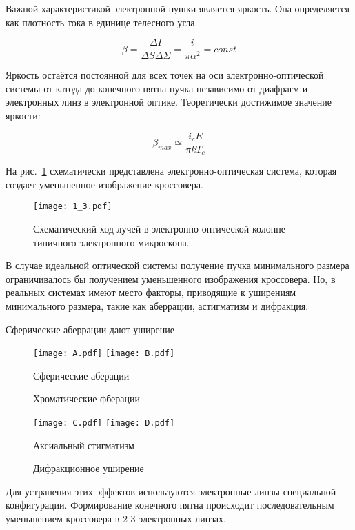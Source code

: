 Важной характеристикой электронной пушки является яркость. Она определяется как плотность тока в единице телесного угла.

\begin{equation}
\beta = \frac{\Delta I}{\Delta S\Delta\Sigma}= \frac{i}{\pi \alpha^2}= const
\label{eq:A2}
\end{equation}

Яркость остаётся постоянной для всех точек на оси электронно-оптической системы от катода до конечного пятна пучка независимо от диафрагм и электронных линз в электронной оптике. Теоретически достижимое значение яркости:

\begin{equation}
\beta_{max} \simeq \frac{i_c E}{\pi kT_c}
\label{eq:A3}
\end{equation}

На рис.~\ref{fig:3} схематически представлена электронно-оптическая система, которая создает уменьшенное изображение кроссовера.

\begin{figure}[H]
\center
\texttt{[image: 1\_3.pdf]}
\caption{Схематический ход лучей в электронно-оптической колонне типичного электронного микроскопа.}
\label{fig:3}
\end{figure}

В случае идеальной оптической системы получение пучка минимального размера ограничивалось бы получением уменьшенного изображения кроссовера. Но, в реальных системах имеют место факторы, приводящие к уширениям минимального размера, такие как аберрации, астигматизм и дифракция.

Сферические аберрации дают уширение

\begin{figure}
    \texttt{[image: A.pdf]}\hfill
    \texttt{[image: B.pdf]}
    \parbox[t]{.47\textwidth}{\caption{Сферические аберации}}\hfill
    \parbox[t]{.47\textwidth}{\caption{Хроматические фберации}}

    \texttt{[image: C.pdf]}\hfill
    \texttt{[image: D.pdf]}
    \parbox[t]{.47\textwidth}{\caption{Аксиальный стигматизм}}\hfill
    \parbox[t]{.47\textwidth}{\caption{Дифракционное уширение}}

\end{figure}

Для устранения этих эффектов используются электронные линзы специальной конфигурации.
Формирование конечного пятна происходит последовательным уменьшением кроссовера в 2-3 электронных линзах.

